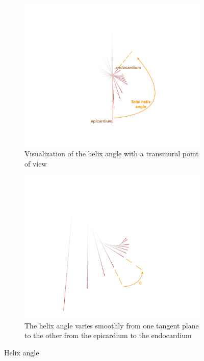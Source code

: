 \begin{figure}
    \centering
    \begin{subfigure}[t]{.48\textwidth}
        \includegraphics[width=\textwidth]{figures/total_angle}
        \caption[b]{Visualization of the helix angle with a transmural point of view}
        \label{fig:total_angle}
    \end{subfigure}
    \begin{subfigure}[t]{.48\textwidth}
        \includegraphics[width=\textwidth]{figures/helix_angle}
        \caption{The helix angle varies smoothly from one tangent plane to the other from the epicardium to the endocardium}
        \label{fig:helix_angle}
    \end{subfigure}
    \caption{Helix angle}
\end{figure}


